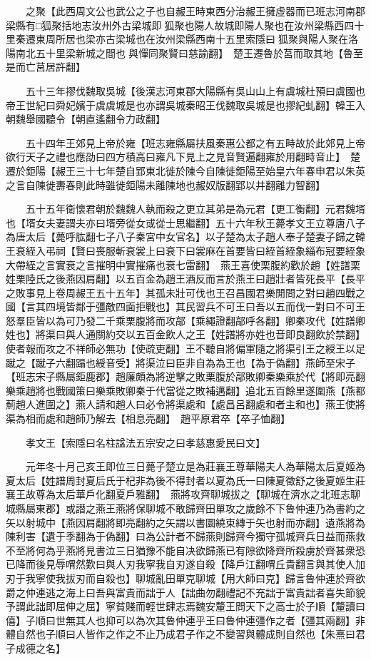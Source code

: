 　　之聚【此西周文公也武公之子也自赧王時東西分治赧王擁虛器而已班志河南郡梁縣有□狐聚括地志汝州外古梁城即狐聚也陽人故城即陽人聚也在汝州梁縣西四十里秦遷東周所居也梁亦古梁城也在汝州梁縣西南十五里索隱曰狐聚與陽人聚在洛陽南北五十里梁新城之間也與憚同聚賢曰慈諭翻】　楚王遷魯於莒而取其地【魯至是而亡莒居許翻】

　　五十三年摎伐魏取吳城【後漢志河東郡大陽縣有吳山山上有虞城杜預曰虞國也帝王世紀曰舜妃嬪于虞虞城是也亦謂吳城秦昭王伐魏取吳城是也摎紀虬翻】韓王入朝魏舉國聽令【朝直遙翻令力政翻】

　　五十四年王郊見上帝於雍【班志雍縣屬扶風秦惠公都之有五畤故於此郊見上帝欲行天子之禮也應劭曰四方積高曰雍凡下見上之見音賢遍翻雍於用翻畤音止】　楚遷於鉅陽【赧王三十七年楚自郢東北徙於陳今自陳徙鉅陽至始皇六年春申君以朱英之言自陳徙夀春則此時雖徙鉅陽未離陳地也赧奴版翻郢以井翻離力智翻】

　　五十五年衛懷君朝於魏魏人執而殺之更立其弟是為元君【更工衡翻】元君魏壻也【壻女夫妻謂夫亦曰壻旁從女或從士思繼翻】五十六年秋王薨孝文王立尊唐八子為唐太后【薨呼肱翻七子八子秦宮中女官名】以子楚為太子趙人奉子楚妻子歸之韓王衰絰入弔祠【賢曰喪服斬衰裳上曰衰下曰裳麻在首要皆曰絰首絰象緇布冠要絰象大帶絰之言實衰之言摧明中實摧痛也衰七雷翻】　燕王喜使栗腹約歡於趙【姓譜栗姓栗陸氏之後燕因肩翻】以五百金為趙王酒反而言於燕王曰趙壯者皆死長平【長平之敗事見上卷周赧王五十五年】其孤未壯可伐也王召昌國君樂閒問之對曰趙四戰之國【言其四境皆鄰于彊敵四面拒戰也】其民習兵不可王曰吾以五而伐一對曰不可王怒羣臣皆以為可乃發二千乘栗腹將而攻鄗【乘繩證翻鄗呼各翻】卿秦攻代【姓譜卿姓也】將渠曰與人通關約交以五百金飲人之王【姓譜將亦姓也音即良翻飲於禁翻】使者報而攻之不祥師必無功【使疏吏翻】王不聽自將偏軍隨之將渠引王之綬王以足蹴之【蹴子六翻蹋也綬音受】將渠泣曰臣非自為為王也【為于偽翻】燕師至宋子【班志宋子縣屬鉅鹿郡】趙廉頗為將逆擊之敗栗腹於鄗敗卿秦樂乘於代【將即亮翻樂乘趙將也戰國策曰樂乘敗卿秦于代當從之敗補邁翻】追北五百餘里遂圍燕【燕都薊趙人進圍之】燕人請和趙人曰必令將渠處和【處昌呂翻處和者主和也】燕王使將渠為相而處和趙師乃解去【相息亮翻】　趙平原君卒【卒子恤翻】

　　孝文王【索隱曰名柱諡法五宗安之曰孝慈惠愛民曰文】

　　元年冬十月己亥王即位三日薨子楚立是為莊襄王尊華陽夫人為華陽太后夏姬為夏太后【姓譜周封夏后氏于杞非為後不得封者以夏為氏一曰陳夏徵舒之後夏姬生莊襄王故尊為太后華戶化翻夏戶雅翻】　燕將攻齊聊城拔之【聊城在濟水之北班志聊城縣屬東郡】或譛之燕王燕將保聊城不敢歸齊田單攻之歲餘不下魯仲連乃為書約之矢以射城中【燕因肩翻將即亮翻約之矢謂以書圜繞束縳于矢也射而亦翻】遺燕將為陳利害【遺于季翻為于偽翻】曰為公計者不歸燕則歸齊今獨守孤城齊兵日益而燕救不至將何為乎燕將見書泣三日猶豫不能自决欲歸燕已有隙欲降齊所殺虜於齊甚衆恐已降而後見辱喟然歎曰與人刃我寧我自刃遂自殺【降戶江翻喟丘貴翻言與其使人加刃于我寧使我拔刃而自殺也】聊城亂田單克聊城【用大師曰克】歸言魯仲連於齊欲爵之仲連逃之海上曰吾與富貴而詘于人【詘曲勿翻禮記不充詘于富貴詘者喜失節貌予謂此詘即屈伸之屈】寧貧賤而輕世肆志焉魏安釐王問天下之高士於子順【釐讀曰僖】子順曰世無其人也抑可以為次其魯仲連乎王曰魯仲連彊作之者【彊其兩翻】非體自然也子順曰人皆作之作之不止乃成君子作之不變習與體成則自然也【朱熹曰君子成德之名】

